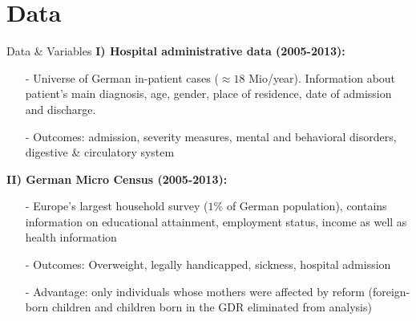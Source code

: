 \documentclass{beamer} %
\begin{document}
\section{Data}
\begin{frame}{Data \& Variables}
\textbf{I) Hospital administrative data (2005-2013):} 
\begin{itemize}
\item[-] Universe of German in-patient cases ($\approx 18$ Mio/year). \newline Information about patient's main diagnosis, age, gender, place of residence, date of admission and discharge.
\item[-] Outcomes: admission, severity measures, mental and behavioral disorders, digestive \& circulatory system
\end{itemize}


\pause
 \textbf{II) German Micro Census (2005-2013):}
\begin{itemize}
\item[-] Europe's largest household survey ($1\%$ of German population), contains information on educational attainment, employment status, income as well as health information
\item[-] Outcomes: Overweight, legally handicapped, sickness, hospital admission

\item[-]Advantage: only individuals whose mothers were affected by reform (foreign-born children and children born in the GDR eliminated from analysis)

\end{itemize} 
 

\end{frame}
\end{document}
